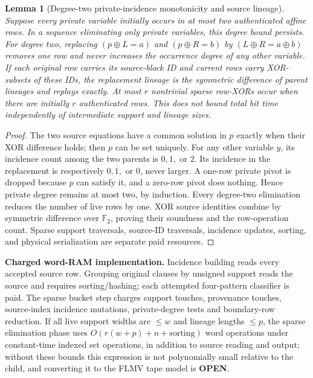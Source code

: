 \documentclass[11pt]{article}
\newtheorem{lemma}{Lemma}
\begin{document}
\begin{lemma}[Degree-two private-incidence monotonicity and source lineage]
Suppose every private variable initially occurs in at most two authenticated affine rows. In a sequence eliminating only private variables, this degree bound persists. For degree two, replacing $(p\oplus L=a)$ and $(p\oplus R=b)$ by $(L\oplus R=a\oplus b)$ removes one row and never increases the occurrence degree of any other variable. If each original row carries its source-block ID and current rows carry XOR-subsets of these IDs, the replacement lineage is the symmetric difference of parent lineages and replays exactly. At most $r$ nontrivial sparse row-XORs occur when there are initially $r$ authenticated rows. This \emph{does not} bound total bit time independently of intermediate support and lineage sizes.
\end{lemma}
\begin{proof}
The two source equations have a common solution in $p$ exactly when their XOR difference holds; then $p$ can be set uniquely. For any other variable $y$, its incidence count among the two parents is $0,1,$ or $2$. Its incidence in the replacement is respectively $0,1,$ or $0$, never larger. A one-row private pivot is dropped because $p$ can satisfy it, and a zero-row pivot does nothing. Hence private degree remains at most two, by induction. Every degree-two elimination reduces the number of live rows by one. XOR source identities combine by symmetric difference over $\mathbb F_2$, proving their soundness and the row-operation count. Sparse support traversals, source-ID traversals, incidence updates, sorting, and physical serialization are separate paid resources.\end{proof}

\noindent\textbf{Charged word-RAM implementation.} Incidence building reads every accepted source row. Grouping original clauses by unsigned support reads the source and requires sorting/hashing; each attempted four-pattern classifier is paid. The sparse bucket step charges support touches, provenance touches, source-index incidence mutations, private-degree tests and boundary-row reduction. If all live support widths are $\le w$ and lineage lengths $\le p$, the sparse elimination phase uses $O(r(w+p)+n+\mathrm{sorting})$ word operations under constant-time indexed set operations, in addition to source reading and output; without these bounds this expression is not polynomially small relative to the child, and converting it to the FLMV tape model is \textbf{OPEN}.
\end{document}
